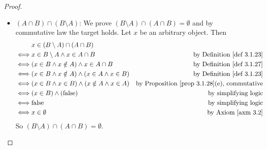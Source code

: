\begin{proof}
\begin{itemize}
    \item \((A \cap B) \cap (B \setminus A)\): We prove \((B \setminus A) \cap (A \cap B) = \emptyset\) and by commutative law the target holds. Let \(x\) be an arbitrary object. Then
        \begin{align*}
             & x \in (B \setminus A) \cap (A \cap B) \\
        \iff & x \in B \setminus A \land x \in A \cap B & \text{by \DEF{3.1.23}} \\
        \iff & (x \in B \land x \notin A) \land x \in A \cap B & \text{by \DEF{3.1.27}} \\
        \iff & (x \in B \land x \notin A) \land (x \in A \land x \in B) & \text{by \DEF{3.1.23}} \\
        \iff & (x \in B \land x \in B) \land (x \notin A \land x \in A) & \text{by \PROP{3.1.28}(e), commutative} \\
        \iff & (x \in B) \land (\text{false}) & \text{by simplifying logic} \\
        \iff & \text{false} & \text{by simplifying logic} \\
        \iff & x \in \emptyset & \text{by \AXM{3.2}}
        \end{align*}
        So \((B \setminus A) \cap (A \cap B) = \emptyset\).
\end{itemize}


\end{proof}
